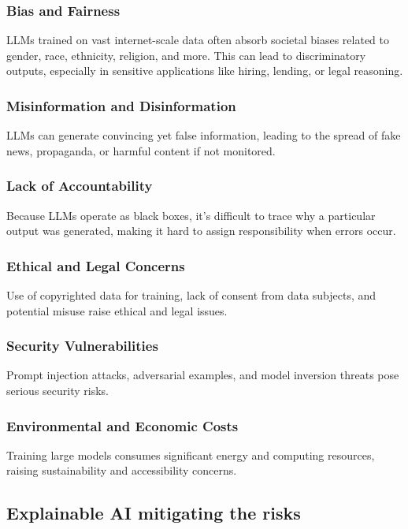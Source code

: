 \documentclass[conference]{IEEEtran}
\begin{document}
\subsubsection{Bias and Fairness}
LLMs trained on vast internet-scale data often absorb societal biases related to gender, race, ethnicity, religion, and more. This can lead to discriminatory outputs, especially in sensitive applications like hiring, lending, or legal reasoning.
\subsubsection{Misinformation and Disinformation}
LLMs can generate convincing yet false information, leading to the spread of fake news, propaganda, or harmful content if not monitored.
\subsubsection{Lack of Accountability}
Because LLMs operate as black boxes, it’s difficult to trace why a particular output was generated, making it hard to assign responsibility when errors occur.
\subsubsection{Ethical and Legal Concerns}
Use of copyrighted data for training, lack of consent from data subjects, and potential misuse raise ethical and legal issues.
\subsubsection{Security Vulnerabilities}
Prompt injection attacks, adversarial examples, and model inversion threats pose serious security risks.
\subsubsection{Environmental and Economic Costs}
Training large models consumes significant energy and computing resources, raising sustainability and accessibility concerns.

\subsection{Explainable AI mitigating the risks}
\end{document}

